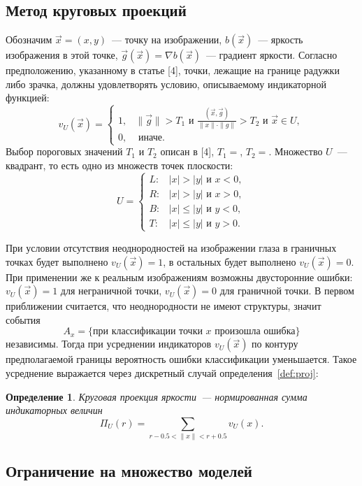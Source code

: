 \documentclass[12pt, twoside]{article}
\newtheorem{definition}{Определение}
\begin{document}
\subsection{Метод круговых проекций}
Обозначим $\vec{x} = (x, y)$~--- точку на изображении, $b(\vec{x})$~--- яркость изображения в этой точке, $\vec{g}(\vec{x}) = \nabla b(\vec{x})$~--- градиент яркости. Согласно предположению, указанному в статье [4], точки, лежащие на границе радужки либо зрачка, должны удовлетворять условию, описываемому индикаторной функцией:
\[
v_U(\vec{x}) = \begin{cases}1, & \| \vec{g} \| > T_1 \text{ и } \frac{(\vec{x}, \vec{g})}{\| x \| \cdot \| g \|} > T_2 \text{ и } \vec{x} \in U, \\ 0, & \text{ иначе.}\end{cases}
\]
Выбор пороговых значений $T_1$ и $T_2$ описан в [4], $T_1 = $, $T_2 = $. Множество $U$~--- квадрант, то есть одно из множеств точек плоскости:
\[
U = \begin{cases}L\!: & |x| > |y| \text{ и } x < 0, \\ R\!: & |x| > |y| \text{ и } x > 0, \\ B\!: & |x| \leqslant |y| \text{ и } y < 0, \\ T\!: & |x| \leqslant |y| \text{ и } y > 0.\end{cases}
\]

При условии отсутствия неоднородностей на изображении глаза в граничных точках будет выполнено $v_U(\vec{x})=1$, в остальных будет выполнено $v_U(\vec{x})=0$. При применении же к реальным изображениям возможны двусторонние ошибки: $v_U(\vec{x})=1$ для неграничной точки, $v_U(\vec{x})=0$ для граничной точки. В первом приближении считается, что неоднородности не имеют структуры, значит события 
\[
A_x = \{\text{при классификации точки }x\text{ произошла ошибка}\}
\]
независимы. Тогда при усреднении индикаторов $v_U(\vec{x})$ по контуру предполагаемой границы вероятность ошибки классификации уменьшается. Такое усреднение выражается через дискретный случай определения~\ref{def:proj}:
\begin{definition}\label{def:proj_sum}
\emph{Круговая проекция яркости}~--- нормированная сумма индикаторных величин
\[
\Pi_U(r) = \sum_{r-0.5 < \|x\|<r+0.5} v_U(x).
\] 
\end{definition}

\subsection{Ограничение на множество моделей}
\end{document}
